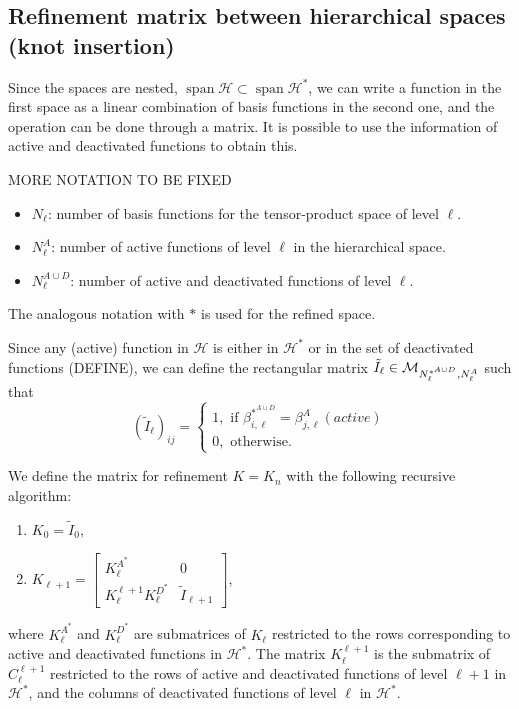 \documentclass[12pt,a4paper,pdftex]{article}
\theoremstyle{plain}
\theoremstyle{definition}
\theoremstyle{remark}
\newcommand{\Rd}{\color{red}}
\DeclareMathOperator{\Span}{span}
\newcommand\HH{\mathcal H}
\begin{document}
\newpage
\subsection{Refinement matrix between hierarchical spaces (knot insertion)}
Since the spaces are nested, $\Span\HH \subset \Span\HH^*$, we can write a function in the first space as a linear combination of basis functions in the second one, and the operation can be done through a matrix. It is possible to use the information of active and deactivated functions to obtain this. 

{\Rd MORE NOTATION TO BE FIXED
\begin{itemize}
\item $N_\ell$: number of basis functions for the tensor-product space of level $\ell$.
\item $N^A_\ell$: number of active functions of level $\ell$ in the hierarchical space.
\item $N^{A\cup D}_\ell$: number of active and deactivated functions of level $\ell$.
\end{itemize}
The analogous notation with $*$ is used for the refined space.
}

Since any (active) function in $\HH$ is either in $\HH^*$ or in the set of deactivated functions {\Rd (DEFINE)}, we can define the rectangular matrix $\tilde I_\ell \in {\cal M}_{N^{*^{A\cup D}}_{\ell}, N^A_\ell}$ such that 
\begin{equation*}
(\tilde I_\ell)_{ij} = \left \{ 
\begin{array}{l}
1, \text{ if }  \beta^{*^{A \cup D}}_{i,\ell} = \beta^A_{j,\ell} (active)\\
0, \text{ otherwise. }
\end{array}
\right.
\end{equation*}

We define the matrix for refinement $K = K_n$ with the following recursive algorithm:
\begin{enumerate}
\item $K_0 = \tilde I_0$,
\item $K_{\ell+1} = \left [ 
\begin{array}{cc}
K^{A^*}_\ell & 0 \\
K_\ell^{\ell+1} K^{D^*}_\ell & \tilde I_{\ell+1}
\end{array}
\right]$,
\end{enumerate}
where $K_\ell^{A^*}$ and $K_\ell^{D^*}$ are submatrices of $K_\ell$ restricted to the rows corresponding to {\Rd active and deactivated functions in $\HH^*$. The matrix $K_\ell^{\ell+1}$ is the submatrix of $C_\ell^{\ell+1}$ restricted to the rows of active and deactivated functions of level $\ell+1$ in $\HH^*$, and the columns of deactivated functions of level $\ell$ in $\HH^*$. }
\end{document}
